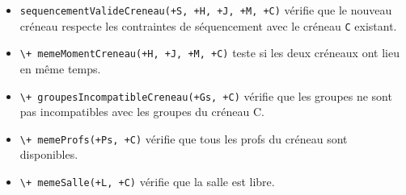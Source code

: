 \begin{itemize}

    \item \texttt{sequencementValideCreneau(+S, +H, +J, +M, +C)} vérifie que
        le nouveau créneau respecte les contraintes de séquencement avec le
        créneau \texttt{C} existant.

    \item \texttt{\textbackslash+ memeMomentCreneau(+H, +J, +M, +C)} teste si
        les deux créneaux ont lieu en même temps.

    \item \texttt{\textbackslash+ groupesIncompatibleCreneau(+Gs, +C)} vérifie
        que les groupes ne sont pas incompatibles avec les groupes du créneau C.

    \item \texttt{\textbackslash+ memeProfs(+Ps, +C)} vérifie que tous les profs
        du créneau sont disponibles.

    \item \texttt{\textbackslash+ memeSalle(+L, +C)} vérifie que la salle est
        libre.

\end{itemize}



